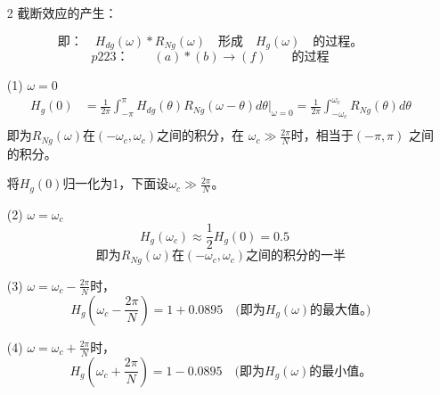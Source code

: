 \documentclass[notheorems,compress,mathserif,table]{beamer}
\begin{document}
\begin{frame}[allowframebreaks]\frametitle{}%
\begin{enumerate}
\item [2] 截断效应的产生：
\end{enumerate}

      $$\mbox{即：}\quad H_{dg}(\omega)\ast R_{Ng}(\omega)\quad\mbox{形成}\quad H_g(\omega)\quad\mbox{的过程。}$$
      $$p223：\quad\quad
      (a)\ast (b)\longrightarrow (f)
      \quad\quad\mbox{的过程}$$
      \begin{enumerate}
        \item[(1)] $\omega=0$
        \begin{equation*}
            \begin{split}
            H_g(0)
              &= \frac{1}{2\pi}\int_{-\pi}^{\pi}
                 H_{dg}(\theta)R_{Ng}(\omega-\theta)d\theta |_{\omega=0}
              = \frac{1}{2\pi}\int_{-\omega_c}^{\omega_c}%
                 R_{Ng}(\theta)d\theta\\
            \end{split}
        \end{equation*}
          即为$R_{Ng}(\omega)$在$(-\omega_c,\omega_c )$之间的积分，在
          $\omega_c \gg \frac{2\pi}{N}$时，相当于$(-\pi,\pi)$ 之间的积分。

          将$H_g(0)$归一化为1，下面设$\omega_c \gg \frac{2\pi}{N}$。
        \item[(2)]$\omega = \omega_c$
            $$H_g(\omega_c) \approx \frac{1}{2}H_g(0)=0.5\quad$$
            $$\mbox{即为$R_{Ng}(\omega)$在$(-\omega_c,\omega_c)$之间的积分的一半}$$
        \item[(3)] $\omega = \omega_c-\frac{2\pi}{N}$时，
            $$H_g(\omega_c-\frac{2\pi}{N}) = 1+0.0895\quad
            \mbox{(即为$H_g(\omega)$的最大值。)}$$
        \item[(4)] $\omega = \omega_c+\frac{2\pi}{N}$时，
            $$H_g(\omega_c+\frac{2\pi}{N}) = 1-0.0895\quad
            \mbox{(即为$H_g(\omega)$的最小值。}$$
      \end{enumerate}
\end{frame}
\end{document}
